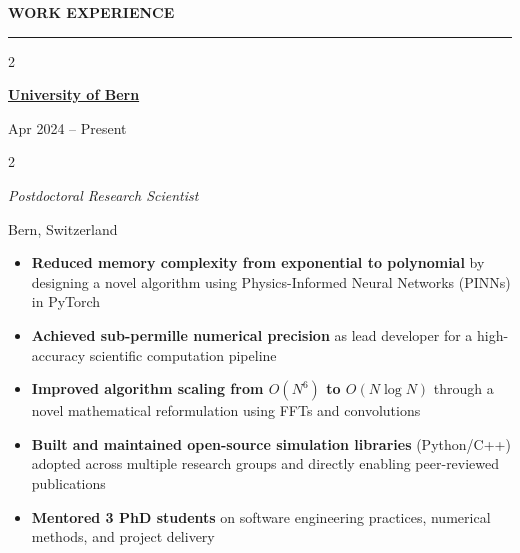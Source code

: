 \documentclass[
  18,
]{article}
\begin{document}
\vspace{9pt}

\begin{large}{\bf WORK EXPERIENCE}
  \vspace{9pt}
  \hrule
  \vspace{9pt}

  \begin{multicols}{2}
    \begin{flushleft}{\bf \href{https://www.unibe.ch/index_eng.html}{University of Bern}}\end{flushleft}
    \begin{flushright}Apr 2024 -- Present\end{flushright}
  \end{multicols}
  \vspace{-0.15cm}
  \begin{multicols}{2}
    \begin{flushleft}\textit{Postdoctoral Research Scientist}\end{flushleft}
    \begin{flushright}Bern, Switzerland\end{flushright}
  \end{multicols}
\end{large}

\vspace{-0.09cm}

\begin{large}
  \begin{itemize}
    \item \textbf{Reduced memory complexity from exponential to polynomial} by designing a novel algorithm using Physics-Informed Neural Networks (PINNs) in PyTorch
    \item \textbf{Achieved sub-permille numerical precision} as lead developer for a high-accuracy scientific computation pipeline
    \item \textbf{Improved algorithm scaling from $O(N^6)$ to $O(N \log N)$} through a novel mathematical reformulation using FFTs and convolutions
    \item \textbf{Built and maintained open-source simulation libraries} (Python/C++) adopted across multiple research groups and directly enabling peer-reviewed publications
    \item \textbf{Mentored 3 PhD students} on software engineering practices, numerical methods, and project delivery
  \end{itemize}
\end{large}
\end{document}
